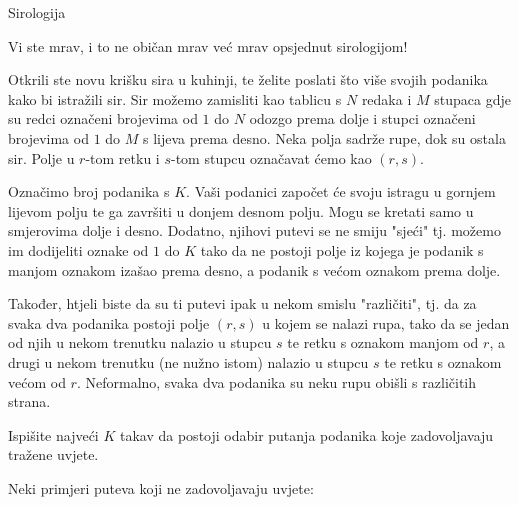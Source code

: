 \begin{statement}[
  problempoints=100,
  timelimit=1 sekunda,
  memorylimit=1024 MiB,
]{Sirologija}

Vi ste mrav, i to ne običan mrav već mrav opsjednut sirologijom!

Otkrili ste novu krišku sira u kuhinji, te želite poslati što više svojih podanika kako bi istražili sir. Sir možemo zamisliti kao tablicu s $N$ redaka i $M$ stupaca gdje su redci označeni brojevima od $1$ do $N$ odozgo prema dolje i stupci označeni brojevima od $1$ do $M$ s lijeva prema desno. Neka polja sadrže rupe, dok su ostala sir. Polje u $r$-tom retku i $s$-tom stupcu označavat ćemo kao $(r, s)$.

Označimo broj podanika s $K$. Vaši podanici započet će svoju istragu u gornjem lijevom polju te ga završiti u donjem desnom polju. Mogu se kretati samo u smjerovima dolje i desno. Dodatno, njihovi putevi se ne smiju "sjeći" tj. možemo im dodijeliti oznake od $1$ do $K$ tako da ne postoji polje iz kojega je podanik s manjom oznakom izašao prema desno, a podanik s većom oznakom prema dolje.

Također, htjeli biste da su ti putevi ipak u nekom smislu "različiti", tj. da za svaka dva podanika postoji polje $(r, s)$ u kojem se nalazi rupa, tako da se jedan od njih u nekom trenutku nalazio u stupcu $s$ te retku s oznakom manjom od $r$, a drugi u nekom trenutku (ne nužno istom) nalazio u stupcu $s$ te retku s oznakom većom od $r$. Neformalno, svaka dva podanika su neku rupu obišli s različitih strana.

Ispišite najveći $K$ takav da postoji odabir putanja podanika koje zadovoljavaju tražene uvjete.

Neki primjeri puteva koji ne zadovoljavaju uvjete:


\end{statement}
